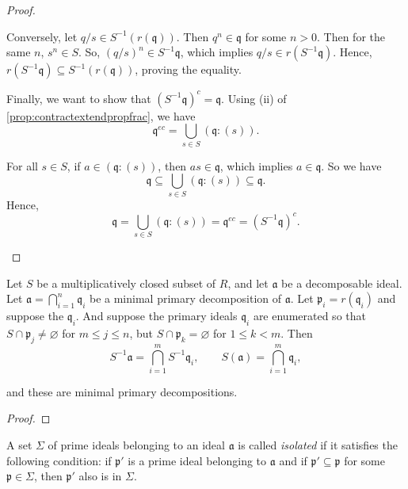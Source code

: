 \begin{proof}
\begin{enumerate}[label=\roman*)]
      Conversely, let \( q / s \in S^{-1}(r(\mathfrak{q})) \). Then \( q^n \in \mathfrak{q} \) for some \( n > 0 \). Then for the same  \( n \),  \( s^n \in S \). So,  \( (q / s)^n \in S^{-1}\mathfrak{q} \), which implies \( q / s \in r(S^{-1}\mathfrak{q}) \). Hence, \( r(S^{-1}\mathfrak{q}) \subseteq S^{-1}(r(\mathfrak{q})) \), proving the equality. 

      Finally, we want to show that \( (S^{-1}\mathfrak{q})^c = \mathfrak{q} \). Using (ii) of \autoref{prop:contractextendpropfrac}, we have
      \[
        \mathfrak{q}^{ec} = \bigcup_{s\in S} (\mathfrak{q} : (s)).
      \]

      For all \( s \in S \), if \( a \in (\mathfrak{q} : (s)) \), then \( as \in \mathfrak{q} \), which implies \( a \in \mathfrak{q} \).
      So we have
      \[
        \mathfrak{q} \subseteq \bigcup_{s \in S} (\mathfrak{q} : (s)) \subseteq \mathfrak{q}.
      \]
    Hence,
    \[
      \mathfrak{q} = \bigcup_{s \in S} (\mathfrak{q} : (s)) = \mathfrak{q}^{ec} = (S^{-1}\mathfrak{q})^c.
    \]
  \end{enumerate}
\end{proof}
\begin{proposition}
  Let \( S \) be a multiplicatively closed subset of  \( R \), and let  \( \mathfrak{a} \) be a decomposable ideal. Let \( \mathfrak{a} = \bigcap_{i=1}^n \mathfrak{q}_i \) be a minimal primary decomposition of \( \mathfrak{a} \). Let \( \mathfrak{p}_i = r(\mathfrak{q}_i) \) and suppose the \( \mathfrak{q}_i \). And suppose the primary ideals \( \mathfrak{q}_i \) are enumerated so that \( S \cap \mathfrak{p}_j \neq \varnothing \) for \( m \le  j \le n \), but  \( S \cap \mathfrak{p}_k = \varnothing \) for \( 1 \le k < m \). Then 
  \[
    S^{-1}\mathfrak{a} = \bigcap_{i=1}^m S^{-1}\mathfrak{q}_i, \qquad S(\mathfrak{a}) = \bigcap_{i=1}^m \mathfrak{q}_i,
  \]

  and these are minimal primary decompositions.
\end{proposition}
\begin{proof}
\end{proof}
\begin{definition}
  A set \( \Sigma \) of prime ideals belonging to an ideal \( \mathfrak{a} \) is called \emph{isolated} if it satisfies the following condition: if \( \mathfrak{p}' \) is a prime ideal belonging to \( \mathfrak{a} \) and if \( \mathfrak{p}' \subseteq \mathfrak{p} \) for some \( \mathfrak{p} \in \Sigma \), then \( \mathfrak{p}' \) also is in \( \Sigma \).
\end{definition}
